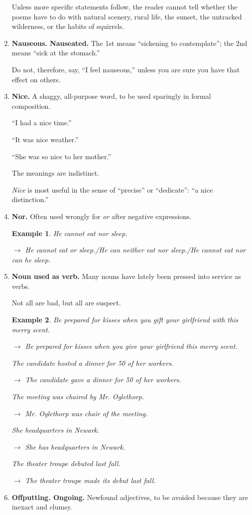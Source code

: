 \documentclass{article}
\newtheorem{example}{Example}
\begin{document}
\begin{enumerate}
	Unless more specific statements follow, the reader cannot tell whether the poems have to do with natural scenery, rural life, the sunset, the untracked wilderness, or the habits of squirrels.
	\item {\bf Nauseous. Nauseated.} The 1st means ``sickening to contemplate''; the 2nd means ``sick at the stomach.''
	
	Do not, therefore, say, ``I feel nauseous,'' unless you are sure you have that effect on others.
	\item {\bf Nice.} A shaggy, all-purpose word, to be used sparingly in formal composition.
	
	``I had a nice time.''
	
	``It was nice weather.''
	
	``She was so nice to her mother.''
	
	The meanings are indistinct.
	
	{\it Nice} is most useful in the sense of ``precise'' or ``dedicate'': ``a nice distinction.''
	\item {\bf Nor.} Often used wrongly for {\it or} after negative expressions.
	\begin{example}
		He cannot eat nor sleep.
		
		$\to$ He cannot eat or sleep./He can neither eat nor sleep./He cannot eat nor can he sleep.
	\end{example}
	\item {\bf Noun used as verb.} Many nouns have lately been pressed into service as verbs.
	
	Not all are bad, but all are suspect.
	\begin{example}
		Be prepared for kisses when you gift your girlfriend with this merry scent.
		
		$\to$ Be prepared for kisses when you give your girlfriend this merry scent.
		
		The candidate hosted a dinner for 50 of her workers.
		
		$\to$ The candidate gave a dinner for 50 of her workers.
		
		The meeting was chaired by Mr. Oglethorp.
		
		$\to$ Mr. Oglethorp was chair of the meeting.
		
		She headquarters in Newark.
		
		$\to$ She has headquarters in Newark.
		
		The theater troupe debuted last fall.
		
		$\to$ The theater troupe made its debut last fall.
	\end{example}
	\item {\bf Offputting. Ongoing.} Newfound adjectives, to be avoided because they are inexact and clumsy.
	

\end{enumerate}
\end{document}
